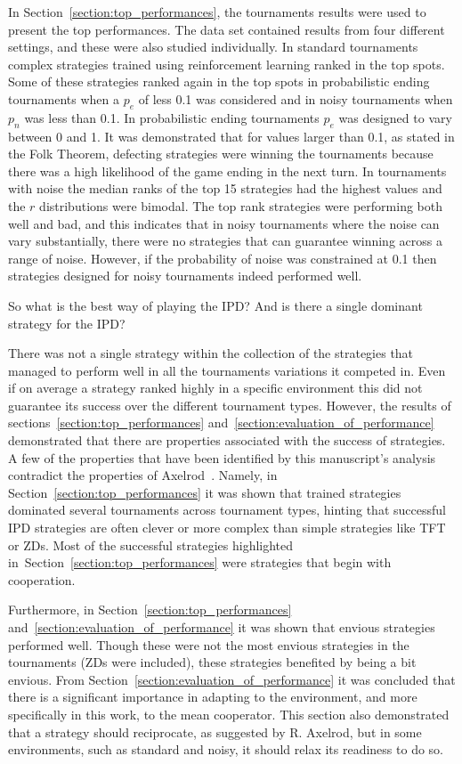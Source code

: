 \documentclass{article}
\newcommand{\numberofstrategies}{}
\begin{document}
In Section~\ref{section:top_performances}, the tournaments results were used to
present the top performances. The data set contained results from four different
settings, and these were also studied individually. In standard tournaments
complex strategies trained using reinforcement learning ranked in the top spots.
Some of these strategies ranked again in the top spots in probabilistic
ending tournaments when a \(p_e\) of less 0.1 was considered and in noisy tournaments
when \(p_n\) was less than 0.1. In probabilistic
ending tournaments \(p_e\) was designed to vary between 0 and 1. It was demonstrated
that for values larger than 0.1, as stated in the Folk Theorem, defecting strategies
were winning the tournaments because there was a high likelihood of the game
ending in the next turn. In tournaments with noise the median ranks of the top
15 strategies had the highest values and the \(r\) distributions were bimodal.
The top rank strategies were performing both well and bad, and this indicates
that in noisy tournaments where the noise can vary substantially,
there were no strategies that can guarantee winning across a range of noise.
However, if the probability of noise was constrained at 0.1 then strategies
designed for noisy tournaments indeed performed well.

So what is the best way of playing the IPD? And is there a single dominant
strategy for the IPD?

There was not a single strategy within the collection of the
\numberofstrategies strategies that managed to perform well in all the
tournaments variations it competed in.
Even if on average a strategy ranked highly in a specific environment this did not
guarantee its success over the different tournament types. However, the results
of sections~\ref{section:top_performances}
and~\ref{section:evaluation_of_performance} demonstrated that there are
properties associated with the success of strategies. A few of the properties that
have been identified by this manuscript's analysis contradict the properties of
Axelrod~\cite{Axelrod1981}. Namely, in Section~\ref{section:top_performances} it
was shown that trained strategies dominated several
tournaments across tournament types, hinting that successful IPD strategies are
often clever or more complex than simple strategies like TFT or ZDs. Most of the
successful strategies highlighted
in~Section~\ref{section:top_performances} were strategies that begin with
cooperation.

Furthermore, in Section~\ref{section:top_performances}
and~\ref{section:evaluation_of_performance} it was shown that envious strategies
performed well. Though these were not the most envious strategies in the
tournaments (ZDs were included), these strategies benefited by being a bit
envious. From Section~\ref{section:evaluation_of_performance} it was concluded
that there is a significant importance in adapting to the environment, and more
specifically in this work, to the mean cooperator. This section also
demonstrated that a strategy should reciprocate, as suggested by R. Axelrod, but in
some environments, such as standard and noisy, it should relax its readiness to
do so.
\end{document}
